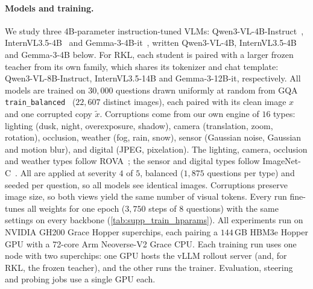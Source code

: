 \paragraph{Models and training.}
We study three 4B-parameter instruction-tuned VLMs: Qwen3-VL-4B-Instruct~\cite{qwen3vl2025},
InternVL3.5-4B~\cite{wang2025internvl35} and Gemma-3-4B-it~\cite{gemmateam2025gemma3technicalreport},
written Qwen3-VL-4B, InternVL3.5-4B and Gemma-3-4B below. For RKL, each student is paired
with a larger frozen teacher from its own family, which shares its tokenizer and chat
template: Qwen3-VL-8B-Instruct, InternVL3.5-14B and Gemma-3-12B-it, respectively. All models
are trained on $30{,}000$ questions drawn uniformly at random from GQA
\texttt{train\_balanced}~\cite{hudson2019gqa} ($22{,}607$ distinct images), each paired with
its clean image $x$ and one corrupted copy $\tilde{x}$. Corruptions come from our own engine
of $16$ types: lighting (dusk, night, overexposure, shadow), camera (translation, zoom,
rotation), occlusion, weather (fog, rain, snow), sensor (Gaussian noise, Gaussian and motion
blur), and digital (JPEG, pixelation). The lighting, camera, occlusion and weather types
follow ROVA~\cite{he2026videoreasoningmodelsready}; the sensor and digital types follow
ImageNet-C~\cite{hendrycks2019imagenetc}. All are applied at severity $4$ of $5$, balanced
($1{,}875$ questions per type) and seeded per question, so all models see identical images.
Corruptions preserve image size, so both views yield the same number of visual tokens. Every
run fine-tunes all weights for one epoch ($3{,}750$ steps of $8$ questions) with the same
settings on every backbone (\cref{tab:supp_train_hparams}). All experiments run on NVIDIA GH200 Grace
Hopper superchips, each pairing a $144$\,GB HBM3e Hopper GPU with a 72-core Arm Neoverse-V2
Grace CPU. Each training run uses one node with two superchips: one GPU hosts the vLLM
rollout server (and, for RKL, the frozen teacher), and the other runs the trainer.
Evaluation, steering and probing jobs use a single GPU each.
